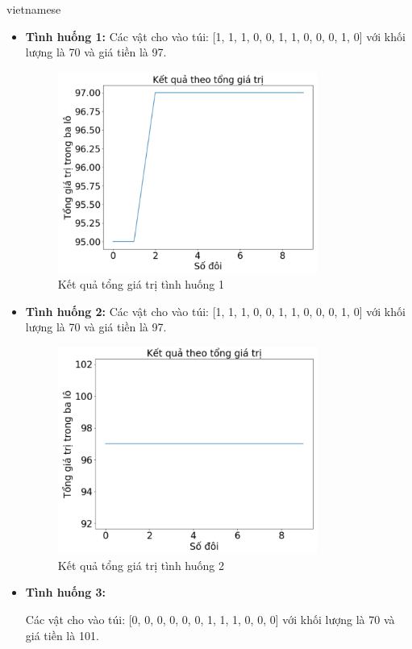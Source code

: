 \documentclass[a4paper]{article}
\begin{document}
\begin{otherlanguage*}{vietnamese}
\begin{enumerate}[leftmargin=7pt]
\begin{itemize}[leftmargin=7pt]
\item \textbf{Tình huống 1:} Các vật cho vào túi:  [1, 1, 1, 0, 0, 1, 1, 0, 0, 0, 1, 0] với khối lượng là 70 và giá tiền là 97.

\begin{figure}[!h]
    \centering
    \includegraphics[width=8.5cm]{r1.png}
    \caption{Kết quả tổng giá trị tình huống 1}
    \label{fig:my_label}
\end{figure}

\item \textbf{Tình huống 2:} Các vật cho vào túi:  [1, 1, 1, 0, 0, 1, 1, 0, 0, 0, 1, 0] với khối lượng là 70 và giá tiền là 97.

\begin{figure}[!h]
    \centering
    \includegraphics[width=8.5cm]{r2.png}
    \caption{Kết quả tổng giá trị tình huống 2}
    \label{fig:my_label}
\end{figure}

\item \textbf{Tình huống 3:}

Các vật cho vào túi:  [0, 0, 0, 0, 0, 0, 1, 1, 1, 0, 0, 0] với khối lượng là 70 và giá tiền là 101.


\end{itemize}
\end{enumerate}
\end{otherlanguage*}
\end{document}

